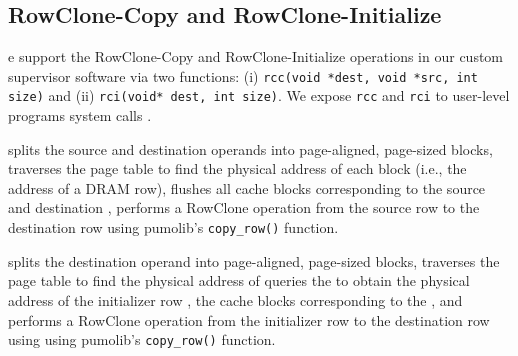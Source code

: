 \subsection{RowClone-Copy and RowClone-Initialize}
\label{sec:rccrci}
e support the RowClone-Copy and RowClone-Initialize operations in our custom supervisor software via two functions: (i)  \texttt{rcc(void *dest, void *src, int size)} and (ii)  \texttt{rci(void* dest, int size)}.  We expose \texttt{rcc} and \texttt{rci} to user-level programs  system calls . 

  splits the source and destination operands into page-aligned, page-sized blocks,  traverses the page table  to find the physical address of each block (i.e., the address of a DRAM row),  flushes all cache blocks corresponding to the source  and  destination , 
performs a RowClone operation from the source row to the destination row using pumolib{'s \texttt{copy\_row()} function}.

  splits the destination operand into page-aligned, page-sized blocks,  traverses the page table to find the physical address of  queries the  to obtain the physical address of the initializer row ,   the cache blocks corresponding to the , and  performs a RowClone operation from the initializer row to the destination row using using pumolib{'s \texttt{copy\_row()} function}. 


